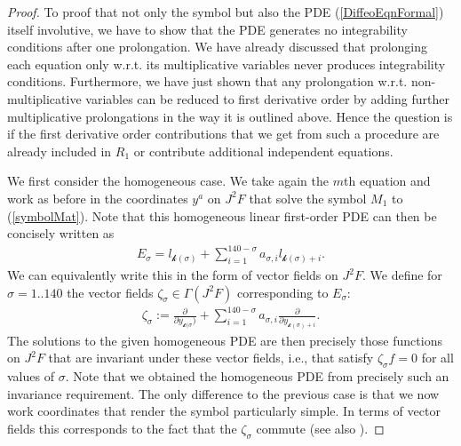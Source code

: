 \begin{proof}
To proof that not only the symbol but also the PDE (\ref{DiffeoEqnFormal}) itself involutive, we have to show that the PDE generates no integrability conditions after one prolongation. We have already discussed that prolonging each equation only w.r.t. its multiplicative variables never produces integrability conditions. Furthermore, we have just shown that any prolongation w.r.t. non-multiplicative variables can be reduced to first derivative order by adding further multiplicative prolongations in the way it is outlined above. Hence the question is if the first derivative order contributions that we get from such a procedure are already included in $R_1$ or contribute additional independent equations. 

We first consider the homogeneous case. We take again the $m$th equation and work as before in the coordinates $y^a$ on $J^2F$ that solve the symbol $M_1$ to (\ref{symbolMat}). Note that this homogeneous linear first-order PDE can then be concisely written as
\begin{align}
    E_{\sigma} = l_{\mathcal{k}(\sigma)} + \sum_{i = 1}^{140-\sigma} a_{\sigma,i} l_{\mathcal{k}(\sigma)+i} .
\end{align}
We can equivalently write this in the form of vector fields on $J^2F$. We define for $\sigma = 1..140$ the vector fields $\zeta_{\sigma} \in \Gamma(J^2F) $ corresponding to $E_{\sigma}$:
\begin{align}
    \zeta_{\sigma} := \frac{\partial}{\partial y_{\mathcal{k}(\sigma})} + \sum_{i = 1}^{140-\sigma} a_{\sigma,i} \frac{\partial}{\partial y_{\mathcal{k}(\sigma)+i}}.
\end{align}
The solutions to the given homogeneous PDE are then precisely those functions on $J^2F$ that are invariant under these vector fields, i.e., that satisfy $\zeta_{\sigma} f = 0$ for all values of $\sigma$.
Note that we obtained the homogeneous PDE from precisely such an invariance requirement. The only difference to the previous case is that we now work coordinates that render the symbol particularly simple. 
In terms of vector fields this corresponds to the fact that the $\zeta_{\sigma}$ commute (see also \cite{seiler1994analysis}).
%
%
%


\end{proof}

